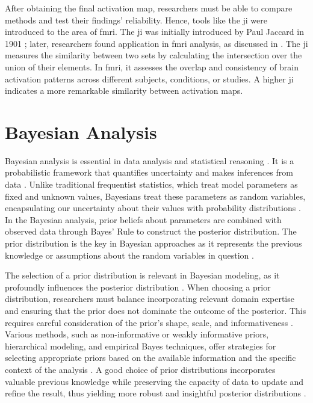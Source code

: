 After obtaining the final activation map, researchers must be able to compare 
methods and test their findings' reliability. Hence, tools like the \gls{ji} 
were introduced to the area of \gls{fmri}. The \gls{ji} was initially introduced 
by Paul Jaccard in 1901 \cite{jaccard1901etude}; later, researchers found 
application in \gls{fmri} analysis, as discussed in \cite{maitra2010re}. 
The \gls{ji} measures the similarity between two sets by calculating the 
intersection over the union of their elements. In \gls{fmri}, it assesses 
the overlap and consistency of brain activation patterns across different 
subjects, conditions, or studies. A higher \gls{ji} indicates a more 
remarkable similarity between activation maps.

\section{Bayesian Analysis}

Bayesian analysis is essential in data analysis and statistical reasoning 
\cite{bernardo1994bayesian, bolstad2016introduction}. It is a probabilistic 
framework that quantifies uncertainty and makes inferences from data 
\cite{van2021bayesian}. Unlike traditional frequentist statistics, which 
treat model parameters as fixed and unknown values, Bayesians treat these 
parameters as random variables, encapsulating our uncertainty about their 
values with probability distributions \cite{bayarri2004interplay}. In the 
Bayesian analysis, prior beliefs about parameters are combined with observed 
data through Bayes' Rule to construct the posterior distribution. The prior 
distribution is the key in Bayesian approaches as it represents the previous 
knowledge or assumptions about the random variables in question 
\cite{gelman2002prior, stone2013bayes}.

The selection of a prior distribution is relevant in Bayesian modeling, as 
it profoundly influences the posterior distribution \cite{kass1996formal}. 
When choosing a prior distribution, researchers must balance incorporating 
relevant domain expertise and ensuring that the prior does not dominate the 
outcome of the posterior. This requires careful consideration of the prior's 
shape, scale, and informativeness \cite{perez2002expected}. Various methods, 
such as non-informative or weakly informative priors, hierarchical modeling, 
and empirical Bayes techniques, offer strategies for selecting appropriate 
priors based on the available information and the specific context of the 
analysis \cite{terenin2017noninformative}. A good choice of prior distributions 
incorporates valuable previous knowledge while preserving the capacity of data 
to update and refine the result, thus yielding more robust and insightful 
posterior distributions \cite{gelman2013bayesian}.


